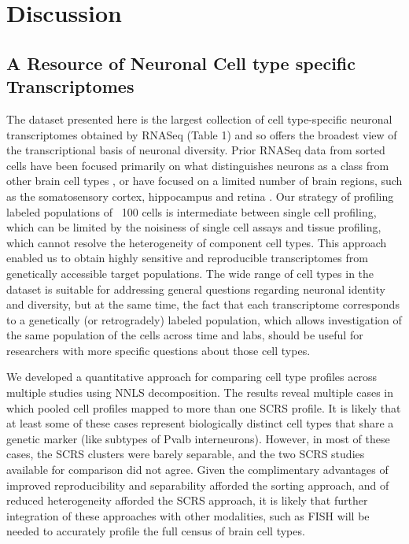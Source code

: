 
\section{Discussion}

\subsection{A Resource of Neuronal Cell type specific Transcriptomes}
The dataset presented here is the largest collection of cell type-specific neuronal transcriptomes obtained by RNASeq (Table 1) and so offers the broadest view of the transcriptional basis of neuronal diversity. Prior RNASeq data from sorted cells have been focused primarily on what distinguishes neurons as a class from other brain cell types \cite{Zhang_2014}, or have focused on a limited number of brain regions, such as the somatosensory cortex, hippocampus  \cite{Zeisel_2015} and retina \cite{Macosko_2015}. Our strategy of profiling labeled populations of ~100 cells is intermediate between single cell profiling, which can be limited by the noisiness of single cell assays \cite{Marinov_2013} and tissue profiling, which cannot resolve the heterogeneity of component cell types\cite{Nelson_2006}. This approach enabled us to obtain highly sensitive and reproducible transcriptomes from genetically accessible target populations. The wide range of cell types in the dataset is suitable for addressing general questions regarding neuronal identity and diversity, but at the same time, the fact that each transcriptome corresponds to a genetically (or retrogradely) labeled population, which allows investigation of the same population of the cells across time and labs, should be useful for researchers with more specific questions about those cell types.

We developed a quantitative approach for comparing cell type profiles across multiple studies using NNLS decomposition. The results reveal multiple cases in which pooled cell profiles mapped to more than one SCRS profile. It is likely that at least some of these cases represent biologically distinct cell types that share a genetic marker (like subtypes of Pvalb interneurons). However, in most of these cases, the SCRS clusters were barely separable, and the two SCRS studies available for comparison did not agree. Given the complimentary advantages of improved reproducibility and separability afforded the sorting approach, and of reduced heterogeneity afforded the SCRS approach, it is likely that further integration of these approaches with other modalities, such as FISH \cite{Moffitt_2016} will be needed to accurately profile the full census of brain cell types. 

